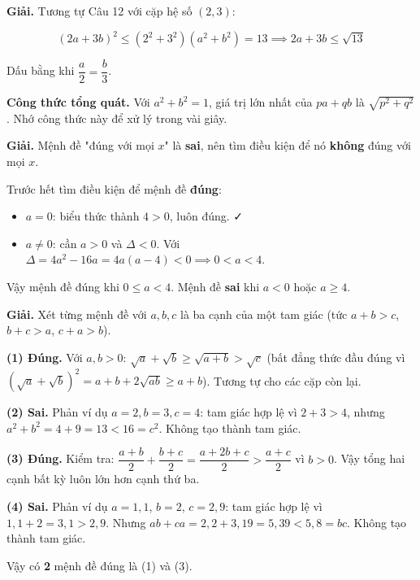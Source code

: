 \documentclass[11pt, a4paper]{article}
\begin{document}
\begin{dapan}[13 — Đáp án A]
\textbf{Giải.} Tương tự Câu 12 với cặp hệ số $(2, 3)$:

$$(2a + 3b)^2 \le (2^2 + 3^2)(a^2 + b^2) = 13 \implies 2a + 3b \le \sqrt{13}$$

Dấu bằng khi $\dfrac{a}{2} = \dfrac{b}{3}$.

\textbf{Công thức tổng quát.} Với $a^2 + b^2 = 1$, giá trị lớn nhất của $pa + qb$ là $\sqrt{p^2 + q^2}$. Nhớ công thức này để xử lý trong vài giây.
\end{dapan}

\begin{dapan}[14 — Đáp án D]
\textbf{Giải.} Mệnh đề "đúng với mọi $x$" là \textbf{sai}, nên tìm điều kiện để nó \textbf{không} đúng với mọi $x$.

Trước hết tìm điều kiện để mệnh đề \textbf{đúng}:

\begin{itemize}[leftmargin=1.4em, itemsep=2pt]
\item $a = 0$: biểu thức thành $4 > 0$, luôn đúng. ✓
\item $a \neq 0$: cần $a > 0$ và $\Delta < 0$. Với $\Delta = 4a^2 - 16a = 4a(a-4) < 0 \implies 0 < a < 4$.
\end{itemize}


Vậy mệnh đề đúng khi $0 \le a < 4$. Mệnh đề \textbf{sai} khi $a < 0$ hoặc $a \ge 4$.
\end{dapan}

\begin{dapan}[15 — Đáp án B]
\textbf{Giải.} Xét từng mệnh đề với $a, b, c$ là ba cạnh của một tam giác (tức $a+b>c$, $b+c>a$, $c+a>b$).

\textbf{(1) Đúng.} Với $a, b > 0$: $\sqrt{a} + \sqrt{b} \ge \sqrt{a+b} > \sqrt{c}$ (bất đẳng thức đầu đúng vì $(\sqrt{a}+\sqrt{b})^2 = a+b+2\sqrt{ab} \ge a+b$). Tương tự cho các cặp còn lại.

\textbf{(2) Sai.} Phản ví dụ $a = 2, b = 3, c = 4$: tam giác hợp lệ vì $2+3 > 4$, nhưng $a^2 + b^2 = 4 + 9 = 13 < 16 = c^2$. Không tạo thành tam giác.

\textbf{(3) Đúng.} Kiểm tra: $\dfrac{a+b}{2} + \dfrac{b+c}{2} = \dfrac{a + 2b + c}{2} > \dfrac{a+c}{2}$ vì $b > 0$. Vậy tổng hai cạnh bất kỳ luôn lớn hơn cạnh thứ ba.

\textbf{(4) Sai.} Phản ví dụ $a = 1{,}1$, $b = 2$, $c = 2{,}9$: tam giác hợp lệ vì $1{,}1 + 2 = 3{,}1 > 2{,}9$. Nhưng $ab + ca = 2{,}2 + 3{,}19 = 5{,}39 < 5{,}8 = bc$. Không tạo thành tam giác.

Vậy có \textbf{2} mệnh đề đúng là (1) và (3).
\end{dapan}
\end{document}
